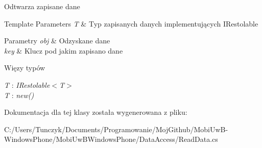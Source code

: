 Odtwarza zapisane dane 


\begin{DoxyTemplParams}{Template Parameters}
{\em T} & Typ zapisanych danych implementujących I\+Restolable\\
\hline
\end{DoxyTemplParams}

\begin{DoxyParams}{Parametry}
{\em obj} & Odzyskane dane\\
\hline
{\em key} & Klucz pod jakim zapisano dane\\
\hline
\end{DoxyParams}
\begin{Desc}
\item[Więzy typów]\begin{description}
\item[{\em T} : {\em I\+Restolable$<$T$>$}]\item[{\em T} : {\em new()}]\end{description}
\end{Desc}


Dokumentacja dla tej klasy została wygenerowana z pliku\+:\begin{DoxyCompactItemize}
\item 
C\+:/\+Users/\+Tunczyk/\+Documents/\+Programowanie/\+Moj\+Github/\+Mobi\+Uw\+B-\/\+Windows\+Phone/\+Mobi\+Uw\+B\+Windows\+Phone/\+Data\+Access/Read\+Data.\+cs\end{DoxyCompactItemize}
